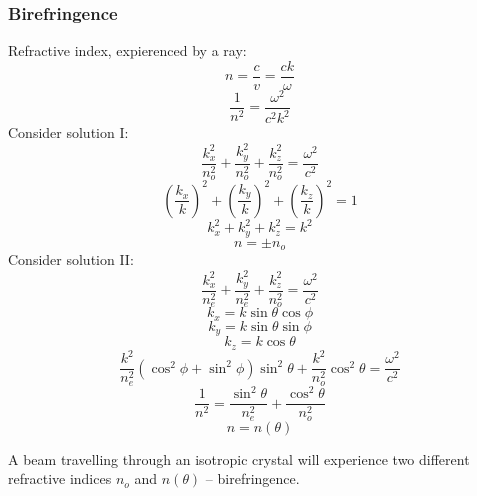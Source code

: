 \documentclass[10pt]{article}
\begin{document}
\subsubsection{Birefringence}
Refractive index, expierenced by a ray:
\begin{equation*}
n = \frac{c}{v} = \frac{ck}{\omega}
\end{equation*}
\begin{equation*}
\frac{1}{n^2} = \frac{\omega^2}{c^2k^2}
\end{equation*}
Consider solution I:
\begin{equation*}
\frac{k_x ^2}{n_o ^2} + \frac{k_y ^2}{n_o ^2} + \frac{k_z ^2}{n_o ^2} = \frac{\omega^2}{c^2}
\end{equation*}
\begin{equation*}
\left(\frac{k_x}{k}\right)^2 + \left(\frac{k_y}{k}\right)^2 + \left(\frac{k_z}{k}\right)^2 = 1
\end{equation*}
\begin{equation*}
k_x ^2 + k_y ^2 + k_z ^2 = k^2
\end{equation*}
\begin{equation*}
n = \pm n_o
\end{equation*}
Consider solution II:
\begin{equation*}
\frac{k_x ^2}{n_e ^2} + \frac{k_y ^2}{n_e ^2} + \frac{k_z ^2}{n_o ^2} = \frac{\omega^2}{c^2}
\end{equation*}
\begin{equation*}
k_x = k \sin{\theta} \cos{\phi}
\end{equation*}
\begin{equation*}
k_y = k \sin{\theta} \sin{\phi}
\end{equation*}
\begin{equation*}
k_z = k \cos{\theta}
\end{equation*}
\begin{equation*}
\frac{k^2}{n_e ^2}(\cos^2{\phi} + \sin^2{\phi})\sin^2{\theta} + \frac{k^2}{n_o ^2}\cos^2{\theta} = \frac{\omega^2}{c^2}
\end{equation*}
\begin{equation}\boxed{
\frac{1}{n^2} = \frac{\sin^2{\theta}}{n_e ^2} + \frac{\cos^2{\theta}}{n_o ^2}
}\end{equation}
\begin{equation*}
n = n(\theta)
\end{equation*}

A beam travelling through an isotropic crystal will experience two different refractive indices $n_o$ and $n(\theta)$ -- birefringence.
\end{document}
